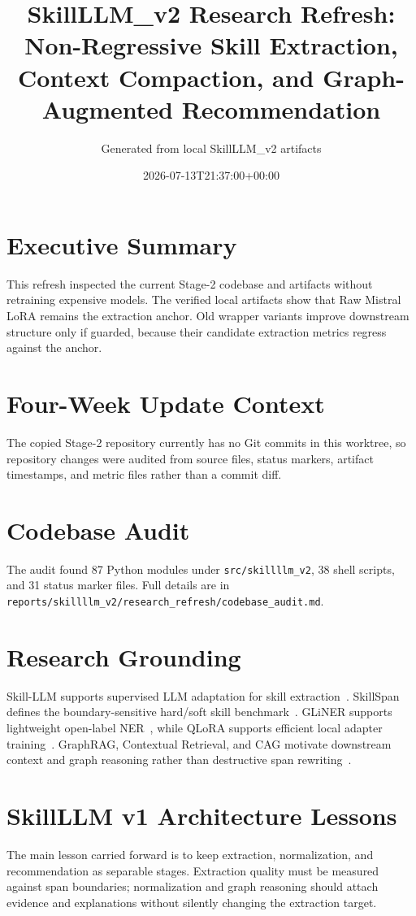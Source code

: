 \documentclass[11pt]{article}
\title{SkillLLM\_v2 Research Refresh: Non-Regressive Skill Extraction, Context Compaction, and Graph-Augmented Recommendation}
\author{Generated from local SkillLLM\_v2 artifacts}
\date{2026-07-13T21:37:00+00:00}
\begin{document}
\maketitle

\section{Executive Summary}
This refresh inspected the current Stage-2 codebase and artifacts without retraining expensive models. The verified local artifacts show that Raw Mistral LoRA remains the extraction anchor. Old wrapper variants improve downstream structure only if guarded, because their candidate extraction metrics regress against the anchor.

\section{Four-Week Update Context}
The copied Stage-2 repository currently has no Git commits in this worktree, so repository changes were audited from source files, status markers, artifact timestamps, and metric files rather than a commit diff.

\section{Codebase Audit}
The audit found 87 Python modules under \texttt{src/skillllm\_v2}, 38 shell scripts, and 31 status marker files. Full details are in \texttt{reports/skillllm\_v2/research\_refresh/codebase\_audit.md}.

\section{Research Grounding}
Skill-LLM supports supervised LLM adaptation for skill extraction~\cite{herandi2024skillllm}. SkillSpan defines the boundary-sensitive hard/soft skill benchmark~\cite{zhang2022skillspan}. GLiNER supports lightweight open-label NER~\cite{zaratiana2024gliner}, while QLoRA supports efficient local adapter training~\cite{dettmers2023qlora}. GraphRAG, Contextual Retrieval, and CAG motivate downstream context and graph reasoning rather than destructive span rewriting~\cite{edge2024graphrag,anthropic2024contextualretrieval,huang2025cag}.

\section{SkillLLM v1 Architecture Lessons}
The main lesson carried forward is to keep extraction, normalization, and recommendation as separable stages. Extraction quality must be measured against span boundaries; normalization and graph reasoning should attach evidence and explanations without silently changing the extraction target.
\end{document}
